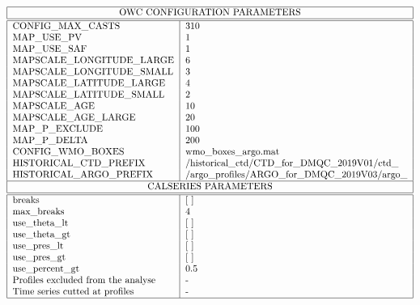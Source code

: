 \begin{table}[h]
$$
\begin{tabular}{|l|l|}
\hline
\multicolumn{2}{|c|}{OWC CONFIGURATION PARAMETERS}  \\
\hline
\hline
CONFIG\_MAX\_CASTS		& 310     	\\
MAP\_USE\_PV			& 1       	\\
MAP\_USE\_SAF		        & 1        	\\
MAPSCALE\_LONGITUDE\_LARGE	& 6     	\\
MAPSCALE\_LONGITUDE\_SMALL	& 3        \\
MAPSCALE\_LATITUDE\_LARGE 	& 4           \\
MAPSCALE\_LATITUDE\_SMALL 	& 2      \\
MAPSCALE\_AGE		 	& 10    \\
MAPSCALE\_AGE\_LARGE		& 20    	\\
MAP\_P\_EXCLUDE		 	& 100      \\
MAP\_P\_DELTA		 	& 200      \\
CONFIG\_WMO\_BOXES       &wmo\_boxes\_argo.mat   \\
HISTORICAL\_CTD\_PREFIX  &/historical\_ctd/CTD\_for\_DMQC\_2019V01/ctd\_   \\
HISTORICAL\_ARGO\_PREFIX  &/argo\_profiles/ARGO\_for\_DMQC\_2019V03/argo\_  \\ 
\hline
\multicolumn{2}{|c|}{CALSERIES PARAMETERS}  \\
\hline
\hline
breaks         & [ ] \\
max\_breaks       & 4 \\
 use\_theta\_lt    & [ ] \\
 use\_theta\_gt    & [ ] \\
 use\_pres\_lt    & [ ] \\
 use\_pres\_gt    & [ ] \\
use\_percent\_gt    & 0.5\\
Profiles excluded from the analyse    & - \\
Time series cutted at profiles    & - \\
\hline
\end{tabular}
$$
\caption{Parameters of the OWC method }
\label{tab3}
\end{table}
